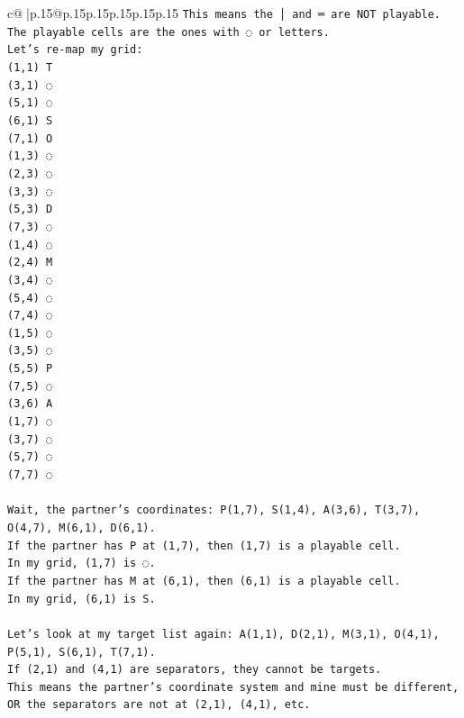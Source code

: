 \documentclass{article}
\begin{document}
{\begin{supertabular}{c@{$\;$}|p{.15\linewidth}@{}p{.15\linewidth}p{.15\linewidth}p{.15\linewidth}p{.15\linewidth}p{.15\linewidth}}
{{{\texttt{This means the │ and ═ are NOT playable.} \\
\texttt{The playable cells are the ones with ◌ or letters.} \\
\texttt{Let's re{-}map my grid:} \\
\texttt{(1,1) T} \\
\texttt{(3,1) ◌} \\
\texttt{(5,1) ◌} \\
\texttt{(6,1) S} \\
\texttt{(7,1) O} \\
\texttt{(1,3) ◌} \\
\texttt{(2,3) ◌} \\
\texttt{(3,3) ◌} \\
\texttt{(5,3) D} \\
\texttt{(7,3) ◌} \\
\texttt{(1,4) ◌} \\
\texttt{(2,4) M} \\
\texttt{(3,4) ◌} \\
\texttt{(5,4) ◌} \\
\texttt{(7,4) ◌} \\
\texttt{(1,5) ◌} \\
\texttt{(3,5) ◌} \\
\texttt{(5,5) P} \\
\texttt{(7,5) ◌} \\
\texttt{(3,6) A} \\
\texttt{(1,7) ◌} \\
\texttt{(3,7) ◌} \\
\texttt{(5,7) ◌} \\
\texttt{(7,7) ◌} \\
\\ 
\texttt{Wait, the partner's coordinates: P(1,7), S(1,4), A(3,6), T(3,7), O(4,7), M(6,1), D(6,1).} \\
\texttt{If the partner has P at (1,7), then (1,7) is a playable cell.} \\
\texttt{In my grid, (1,7) is ◌.} \\
\texttt{If the partner has M at (6,1), then (6,1) is a playable cell.} \\
\texttt{In my grid, (6,1) is S.} \\
\\ 
\texttt{Let's look at my target list again: A(1,1), D(2,1), M(3,1), O(4,1), P(5,1), S(6,1), T(7,1).} \\
\texttt{If (2,1) and (4,1) are separators, they cannot be targets.} \\
\texttt{This means the partner's coordinate system and mine must be different, OR the separators are not at (2,1), (4,1), etc.} \\
}}}
\end{supertabular}}
\end{document}
